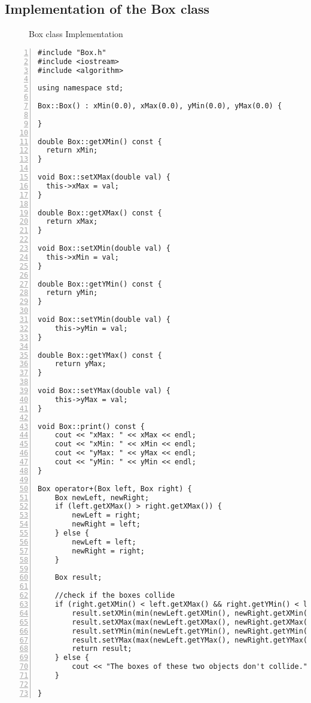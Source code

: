 \documentclass{article}
\begin{document}
\subsection{Implementation of the Box class}
\begin{figure}
  \scriptsize{\caption{Box class Implementation}}
\end{figure}
\begin{lstlisting}[basicstyle=\footnotesize\ttfamily, numbers=left, stepnumber=1, numberstyle = \normalsize, caption={My Caption}]
#include "Box.h"
#include <iostream>
#include <algorithm>

using namespace std;

Box::Box() : xMin(0.0), xMax(0.0), yMin(0.0), yMax(0.0) {

}

double Box::getXMin() const {
  return xMin;
}

void Box::setXMax(double val) {
  this->xMax = val;
}

double Box::getXMax() const {
  return xMax;
}

void Box::setXMin(double val) {
  this->xMin = val;
}

double Box::getYMin() const {
  return yMin;
}

void Box::setYMin(double val) {
	this->yMin = val;
}

double Box::getYMax() const {
	return yMax;
}

void Box::setYMax(double val) {
	this->yMax = val;
}

void Box::print() const {
	cout << "xMax: " << xMax << endl;
	cout << "xMin: " << xMin << endl;
	cout << "yMax: " << yMax << endl;
	cout << "yMin: " << yMin << endl;
}

Box operator+(Box left, Box right) {
	Box newLeft, newRight;
	if (left.getXMax() > right.getXMax()) {
		newLeft = right;
		newRight = left;
	} else {
		newLeft = left;
		newRight = right;
	}

	Box result;

	//check if the boxes collide
	if (right.getXMin() < left.getXMax() && right.getYMin() < left.getYMax()) {
		result.setXMin(min(newLeft.getXMin(), newRight.getXMin()));
		result.setXMax(max(newLeft.getXMax(), newRight.getXMax()));
		result.setYMin(min(newLeft.getYMin(), newRight.getYMin()));
		result.setYMax(max(newLeft.getYMax(), newRight.getYMax()));
		return result;
	} else {
		cout << "The boxes of these two objects don't collide." << '\n';
	}

}
\end{lstlisting}
\end{document}
